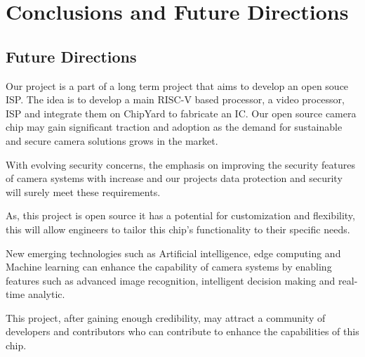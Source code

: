 
\chapter{Conclusions and Future Directions} %
\label{Chapter6}

\section{Future Directions}
Our project is a part of a long term project that aims to develop an open souce ISP. The idea is to develop a main RISC-V based processor, a video processor, ISP and integrate them on ChipYard to fabricate an IC. Our open source camera chip may gain significant traction and adoption as the demand for sustainable and secure camera solutions grows in the market.

With evolving security concerns, the emphasis on improving the security features of camera systems with increase and our projects data protection and security will surely meet these requirements.

As, this project is open source it has a potential for customization and flexibility, this will allow engineers to tailor this chip's functionality to their specific needs.

New emerging technologies such as Artificial intelligence, edge computing and Machine learning can enhance the capability of camera systems by enabling features such as advanced image recognition, intelligent decision making and real-time analytic.

This project, after gaining enough credibility, may attract a community of developers and contributors who can contribute to enhance the capabilities of this chip.